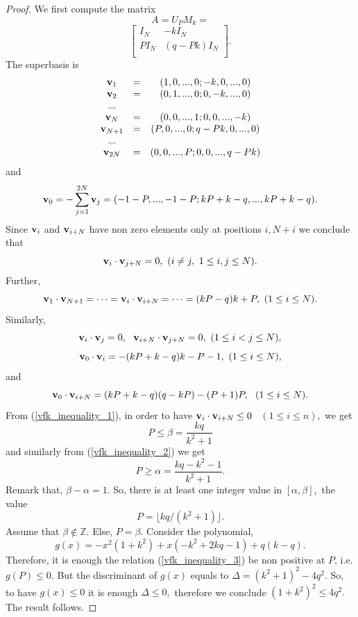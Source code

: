 \documentclass{amsart}
\numberwithin{equation}{section}
\begin{document}
\begin{proof}
We first compute the matrix
$$A = U_PM_k=$$
\begin{equation}\label{vfk-matrix}
 \left[\begin{array}{c|c}
I_N & -kI_N  \\
\hline
PI_N & (q-Pk)I_N   \\
\end{array}\right].
\end{equation}
The superbasis is 
$$	
\begin{array}{ccc}
{\textbf v}_1 & = &(1,0,...,0;-k,0,...,0)\\
{\textbf v}_2 & =  & (0,1,...,0; 0,-k,...,0)\\
... \\
{\textbf v}_N & = &(0,0,...,1;0,0,...,-k) \\
{\textbf v}_{N+1} & = &(P,0,...,0;q-Pk,0,...,0) \\
...\\
{\textbf v}_{2N} & = & (0,0,...,P;0,0,...,q-Pk)\\
\end{array}
$$ 
and
$${\textbf v}_0 = -\sum_{j=1}^{2N} {\textbf v}_j=(-1-P,...,-1-P;kP+k-q,...,kP+k-q).$$
Since ${\textbf v}_i$ and ${\textbf v}_{i+N}$ have non zero elements only at positions $i, N+i$ we conclude that
$${\textbf v}_i\cdot {\textbf v}_{j+N}=0,\ (i\not=j,\ 1\leq i,j\leq N).$$
Further,
\begin{equation}\label{vfk_inequality_1}
{\textbf v}_1\cdot {\textbf v}_{N+1} = \cdots={\textbf v}_i\cdot {\textbf v}_{i+N}=\cdots=(kP - q)k + P, \ (1\leq i \leq N).
\end{equation}			 
Similarly, 
$${\textbf v}_i\cdot {\textbf v}_j=0, \ \ {\textbf v}_{i+N}\cdot {\textbf v}_{j+N}=0,\ (1\leq i<j\leq N),$$
\begin{equation}\label{vfk_inequality_2}
{\textbf v}_0\cdot {\textbf v}_i =  -(kP + k - q)k - P - 1,\ (1\leq i\leq N),
\end{equation}			 
and
\begin{equation}\label{vfk_inequality_3}
{\textbf v}_0\cdot {\textbf v}_{i+N} =  (kP + k - q)(q-kP) - (P + 1)P,\ \ (1\leq i\leq N).
\end{equation}		
From (\ref{vfk_inequality_1}), in order to have ${\textbf v}_i\cdot {\textbf v}_{i+N}\leq 0$ \ $(1\le i\le n),$  we get 
$$P\le \beta=\frac{kq}{k^2+1}$$
and similarly from (\ref{vfk_inequality_2}) we get $$P\ge \alpha=\frac{kq-k^2-1}{k^2+1}.$$
Remark that,	
 $\beta - \alpha = 1.$ So, there is at least one   integer value in 
$[\alpha,\beta],$ the value 
\begin{equation}\label{value_of_P}
P=\lfloor kq/(k^2+1)\rfloor.
\end{equation}
Assume that $\beta\not\in {\mathbb{Z}}.$
Else, $P=\beta.$ 
Consider the polynomial, 
$$g(x) = -x^2(1+k^2)+x(-k^2+2kq-1)+q(k-q).$$
Therefore, it is enough the relation (\ref{vfk_inequality_3}) be non positive at $P$, i.e. $g(P)\leq 0.$
But the discriminant of $g(x)$ equals to $\Delta = (k^2+1)^2-4q^2.$ So, to have $g(x)\leq 0$ it is enough $\Delta\leq 0,$ therefore we conclude $(1+k^2)^2\le 4q^2.$ The result follows.
\end{proof}
\end{document}
